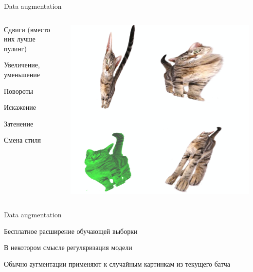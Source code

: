 \documentclass[notes,12pt, aspectratio=169]{beamer}
\newenvironment{wideitemize}{\itemize\addtolength{\itemsep}{10pt}}{\enditemize}
\begin{document}
\begin{frame}{Data augmentation}
\begin{columns}[T] %
\begin{column}{.5\textwidth}
	\begin{wideitemize}
		\item  Сдвиги \alert{(вместо них лучше пулинг)}
		\item Увеличение, уменьшение
		\item Повороты
		\item Искажение
		\item Затенение 
		\item Смена стиля
	\end{wideitemize}
\end{column}%
\hfill%
\begin{column}{.5\textwidth}
	\includegraphics[scale=0.2]{still_cat.png}
\end{column}%
\end{columns}
\end{frame}


\begin{frame}{Data augmentation}
\begin{wideitemize}
	\item  Бесплатное расширение обучающей выборки
	\item  В некотором смысле регуляризация модели
	\item  Обычно аугментации применяют к случайным картинкам из текущего батча 
\end{wideitemize}
\end{frame}
\end{document}
